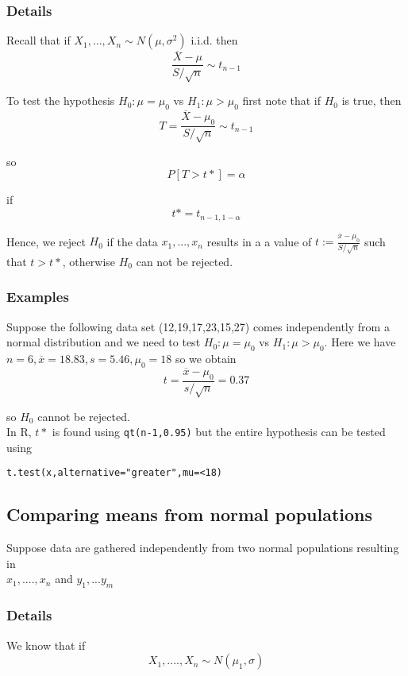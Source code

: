 \documentclass[12pt,a4paper]{article}
\theoremstyle{regla}
\theoremstyle{remark}
\theoremstyle{definition}
\theoremstyle{nonumberbreak}
\begin{document}
\subsubsection{Details}
Recall that if $X_1,\ldots,X_n \sim N(\mu,\sigma^2)$ i.i.d. then $$\frac{\overline{X}-\mu}{S/\sqrt{n}}\sim t_{n-1}$$

To test the hypothesis $H_0:\mu=\mu_{0}$ vs $H_1:\mu > \mu_{0}$ first note that if $H_0$ is true, then 
$$T= \frac{\overline{X}-\mu_{0}}{S/\sqrt{n}} \sim t_{n-1}$$

so $$P[T>t*]=\alpha$$

if $$t*=t_{n-1,1-\alpha}$$

Hence, we reject $H_0$ if the data $x_1,...,x_n$ results in a a value of 
$t:=\frac{\overline{x}-\mu_0}{S/\sqrt{n}}$ such that $t>t*$, otherwise $H_0$ can not be rejected. 
\subsubsection{Examples}
\begin{xmpl}
 Suppose the following data set (12,19,17,23,15,27) comes independently from a normal distribution and we need to test $H_0:\mu=\mu_0$ vs $H_1:\mu>\mu_0$. Here we have $n=6,\overline{x}=18.83, s=5.46, \mu_0=18$ so we obtain
$$t=\frac{\overline{x}-\mu_0}{s/\sqrt{n}}= 0.37$$

so $H_0$ cannot be rejected.\\

In R, $t*$ is found using \texttt{qt(n-1,0.95)} but the entire hypothesis can be tested using
\begin{lstlisting}
t.test(x,alternative="greater",mu=<18)
\end{lstlisting}
\end{xmpl}

\subsection{Comparing means from normal populations}
\begin{fbox}
\begin{minipage}{0.97\textwidth}
Suppose data are gathered independently from two normal populations resulting in \\
$x_1,....,x_n$    and       $y_1,...y_m$
\end{minipage}
\end{fbox}
\subsubsection{Details}
We know that if\\ 
$$X_1, ...., X_n \sim N(\mu_1,\sigma)$$
\end{document}
